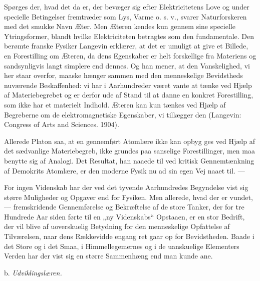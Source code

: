 \documentclass[12pt,a4paper,openany]{book}
\newcommand{\opage}[1]{\marginnote{\footnotesize\textit{[#1]}}}
\newcommand{\sectionhead}[2]{\par\bigskip\phantomsection\begin{center}#1 \textit{#2}\end{center}\addcontentsline{toc}{section}{#1 #2}\medskip\ignorespaces}
\begin{document}
Spørges der, hvad det da er, der bevæger sig efter Elektricitetens
Love og under specielle Betingelser fremtræder som Lys, Varme
o. s. v., svarer Naturforskeren med det smukke Navn Æter. Men
Æteren kendes kun gennem sine specielle Ytringsformer, blandt
hvilke Elektriciteten betragtes som den fundamentale. Den berømte
franske Fysiker Langevin erklærer, at det er umuligt at give et Billede,
en Forestilling om Æteren, da dens Egenskaber er helt forskellige
fra Materiens og sandsynligvis langt simplere end dennes.
Og han mener, at den Vanskelighed, vi her staar overfor, maaske
hænger sammen med den menneskelige Bevidstheds nuværende Beskaffenhed:
vi har i Aarhundreder været vante at tænke ved Hjælp
af Materiebegrebet og er derfor ude af Stand til at danne en
konkret Forestilling, som ikke har et materielt Indhold. Æteren
kan kun tænkes ved Hjælp af Begreberne om de elektromagnetiske
Egenskaber, vi tillægger den (Langevin: Congress of Arts and
Sciences. 1904).

Allerede Platon saa, at en gennemført Atomlære ikke kan opbyg%
\opage{32}ges ved Hjælp af det sædvanlige Materiebegreb, ikke grundes paa
sanselige Forestillinger, men maa benytte sig af Analogi. Det Resultat,
han naaede til ved kritisk Gennemtænkning af Demokrits Atomlære,
er den moderne Fysik nu ad sin egen Vej naaet til. ---

For ingen Videnskab har der ved det tyvende Aarhundredes Begyndelse
vist sig større Muligheder og Opgaver end for Fysiken. Men
allerede, hvad der er vundet, --- fremskridende Gennemførelse og
Bekræftelse af de store Tanker, der for tre Hundrede Aar siden førte
til en „ny Videnskabs“ Opstaaen, er en stor Bedrift, der vil blive af
uoverskuelig Betydning for den menneskelige Opfattelse af Tilværelsen,
naar dens Rækkevidde engang ret gaar op for Bevidstheden.
Baade i det Store og i det Smaa, i Himmellegemernes og i de uanskuelige
Elementers Verden har der vist sig en større Sammenhæng
end man kunde ane.
\sectionhead{b.}{Udviklingslæren.}
\end{document}
